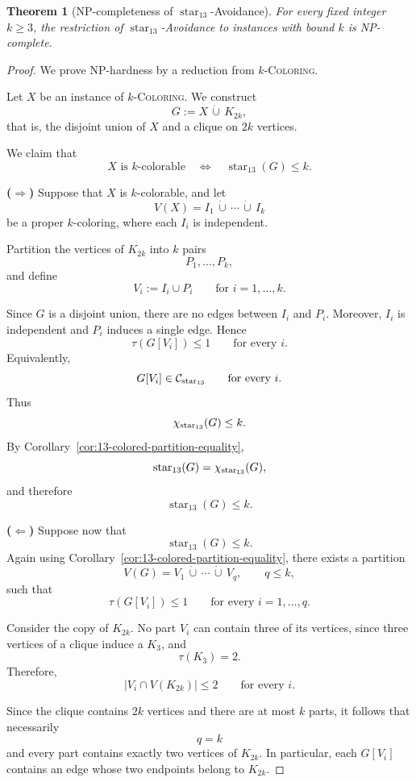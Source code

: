 \documentclass[12pt]{article}
\theoremstyle{plain}
\newtheorem{theorem}{Theorem}[section]
\theoremstyle{definition}
\theoremstyle{remark}
\theoremstyle{definition}
\newcommand{\starlabel}{\mathrm{star}}
\DeclareRobustCommand{\starparam}[1]{%
  \ensuremath{\mathop{\starlabel}\nolimits_{#1}}%
}
\begin{document}
\begin{theorem}[NP-completeness of \(\starparam{13}\)-Avoidance]
\label{thm:star13-np-complete}
For every fixed integer \(k\ge 3\), the restriction of
\(\starparam{13}\)-Avoidance to instances with bound \(k\) is NP-complete.
\end{theorem}

\begin{proof}
We prove NP-hardness by a reduction from
\(k\)-\textsc{Coloring}.

Let \(X\) be an instance of \(k\)-\textsc{Coloring}. We construct
\[
G:=X\,\dot\cup\,K_{2k},
\]
that is, the disjoint union of \(X\) and a clique on \(2k\) vertices.

We claim that
\[
X\text{ is \(k\)-colorable}
\quad\Longleftrightarrow\quad
\starparam{13}(G)\le k.
\]

\medskip
\noindent\textbf{(\(\Rightarrow\))}
Suppose that \(X\) is \(k\)-colorable, and let
\[
V(X)=I_1\,\dot\cup\,\cdots\,\dot\cup\,I_k
\]
be a proper \(k\)-coloring, where each \(I_i\) is independent.

Partition the vertices of \(K_{2k}\) into \(k\) pairs
\[
P_1,\dots,P_k,
\]
and define
\[
V_i:=I_i\cup P_i
\qquad
\text{for }i=1,\dots,k.
\]

Since \(G\) is a disjoint union, there are no edges between \(I_i\) and
\(P_i\). Moreover, \(I_i\) is independent and \(P_i\) induces a single
edge. Hence
\[
\tau(G[V_i])\le1
\qquad
\text{for every }i.
\]
Equivalently,
\[
G[V_i]\in\mathcal C_{\starparam{13}}
\qquad
\text{for every }i.
\]
Thus
\[
\chi_{\starparam{13}}(G)\le k.
\]
By Corollary~\ref{cor:13-colored-partition-equality},
\[
\starparam{13}(G)=\chi_{\starparam{13}}(G),
\]
and therefore
\[
\starparam{13}(G)\le k.
\]

\medskip
\noindent\textbf{(\(\Leftarrow\))}
Suppose now that
\[
\starparam{13}(G)\le k.
\]
Again using Corollary~\ref{cor:13-colored-partition-equality}, there exists
a partition
\[
V(G)=V_1\,\dot\cup\,\cdots\,\dot\cup\,V_q,
\qquad
q\le k,
\]
such that
\[
\tau(G[V_i])\le1
\qquad
\text{for every }i=1,\dots,q.
\]

Consider the copy of \(K_{2k}\). No part \(V_i\) can contain three of its
vertices, since three vertices of a clique induce a \(K_3\), and
\[
\tau(K_3)=2.
\]
Therefore,
\[
|V_i\cap V(K_{2k})|\le2
\qquad
\text{for every }i.
\]

Since the clique contains \(2k\) vertices and there are at most \(k\) parts,
it follows that necessarily
\[
q=k
\]
and every part contains exactly two vertices of \(K_{2k}\). In particular,
each \(G[V_i]\) contains an edge whose two endpoints belong to \(K_{2k}\).


\end{proof}
\end{document}
